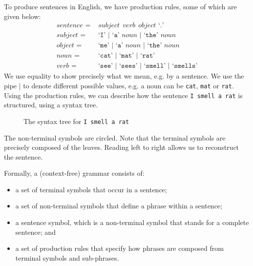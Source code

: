 \documentclass[a4paper, openany]{memoir}
\begin{document}
To produce sentences in English, we have production rules, some of which are given below:
\begin{align*}
    \textit{sentence } =& \textit{ subject} \ \ \textit{verb} \ \ \textit{object} \text{ `}\texttt{.}\text{'} \\
    \textit{subject } =& \text{ `}\texttt{I}\text{' } | \text{ `}\texttt{a}\text{' } \textit{noun } | \text{ `}\texttt{the}\text{' } \textit{noun} \\
    \textit{object } =& \text{ `}\texttt{me}\text{' } | \text{ `}\texttt{a}\text{' } \textit{noun } | \text{ `}\texttt{the}\text{' } \textit{noun} \\
    \textit{noun } =& \text{ `}\texttt{cat}\text{' } | \text{ `}\texttt{mat}\text{' } | \text{ `}\texttt{rat}\text{'} \\
    \textit{verb } =&  \text{ `}\texttt{see}\text{' } | \text{ `}\texttt{sees}\text{' } | \text{ `}\texttt{smell}\text{' } | \text{ `}\texttt{smells}\text{'}
\end{align*}
We use equality to show precisely what we mean, e.g. by a sentence. We use the pipe | to denote different possible values, e.g. a noun can be \texttt{cat}, \texttt{mat} or \texttt{rat}. Using the production rules, we can describe how the sentence \texttt{I smell a rat} is structured, using a syntax tree.
\begin{figure}[H]
    \centering
    \caption{The syntax tree for \texttt{I smell a rat}}
\end{figure}
\noindent The non-terminal symbols are circled. Note that the terminal symbols are precisely composed of the leaves. Reading left to right allows us to reconstruct the sentence.

Formally, a (context-free) grammar consists of:
\begin{itemize}
    \item a set of terminal symbols that occur in a sentence;
    \item a set of non-terminal symbols that define a phrase within a sentence;
    \item a sentence symbol, which is a non-terminal symbol that stands for a complete sentence; and
    \item a set of production rules that specify how phrases are composed from terminal symbols and sub-phrases.
\end{itemize}
\end{document}
